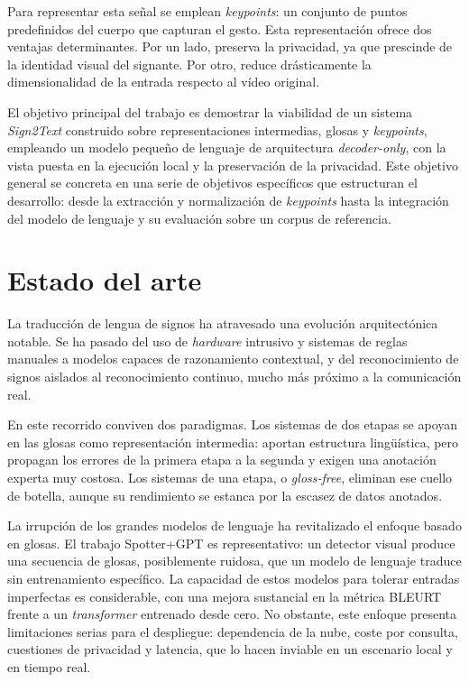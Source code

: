 \documentclass[11pt]{article}
\begin{document}
Para representar esta señal se emplean \textit{keypoints}: un conjunto de puntos predefinidos del cuerpo que capturan el gesto. Esta representación ofrece dos ventajas determinantes. Por un lado, preserva la privacidad, ya que prescinde de la identidad visual del signante. Por otro, reduce drásticamente la dimensionalidad de la entrada respecto al vídeo original.

El objetivo principal del trabajo es demostrar la viabilidad de un sistema \textit{Sign2Text} construido sobre representaciones intermedias, glosas y \textit{keypoints}, empleando un modelo pequeño de lenguaje de arquitectura \textit{decoder-only}, con la vista puesta en la ejecución local y la preservación de la privacidad. Este objetivo general se concreta en una serie de objetivos específicos que estructuran el desarrollo: desde la extracción y normalización de \textit{keypoints} hasta la integración del modelo de lenguaje y su evaluación sobre un corpus de referencia.

\section{Estado del arte}

La traducción de lengua de signos ha atravesado una evolución arquitectónica notable. Se ha pasado del uso de \textit{hardware} intrusivo y sistemas de reglas manuales a modelos capaces de razonamiento contextual, y del reconocimiento de signos aislados al reconocimiento continuo, mucho más próximo a la comunicación real.

En este recorrido conviven dos paradigmas. Los sistemas de dos etapas se apoyan en las glosas como representación intermedia: aportan estructura lingüística, pero propagan los errores de la primera etapa a la segunda y exigen una anotación experta muy costosa. Los sistemas de una etapa, o \textit{gloss-free}, eliminan ese cuello de botella, aunque su rendimiento se estanca por la escasez de datos anotados.

La irrupción de los grandes modelos de lenguaje ha revitalizado el enfoque basado en glosas. El trabajo Spotter+GPT es representativo: un detector visual produce una secuencia de glosas, posiblemente ruidosa, que un modelo de lenguaje traduce sin entrenamiento específico. La capacidad de estos modelos para tolerar entradas imperfectas es considerable, con una mejora sustancial en la métrica BLEURT frente a un \textit{transformer} entrenado desde cero. No obstante, este enfoque presenta limitaciones serias para el despliegue: dependencia de la nube, coste por consulta, cuestiones de privacidad y latencia, que lo hacen inviable en un escenario local y en tiempo real.
\end{document}
